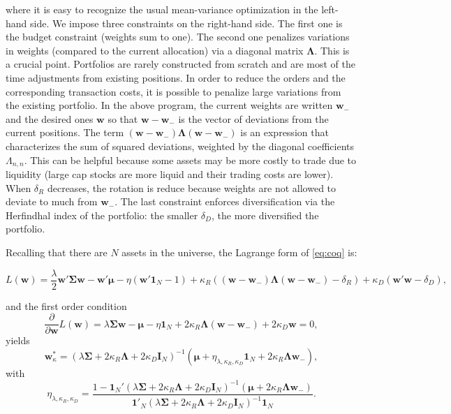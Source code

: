 \documentclass[]{krantz}
\theoremstyle{definition}
\theoremstyle{definition}
\theoremstyle{definition}
\theoremstyle{remark}
\begin{document}
where it is easy to recognize the usual mean-variance optimization in
the left-hand side. We impose three constraints on the right-hand side.
The first one is the budget constraint (weights sum to one). The second
one penalizes variations in weights (compared to the current allocation)
via a diagonal matrix \(\boldsymbol{\Lambda}\). This is a crucial point.
Portfolios are rarely constructed from scratch and are most of the time
adjustments from existing positions. In order to reduce the orders and
the corresponding transaction costs, it is possible to penalize large
variations from the existing portfolio. In the above program, the
current weights are written \(\textbf{w}_-\) and the desired ones
\(\textbf{w}\) so that \(\textbf{w}-\textbf{w}_-\) is the vector of
deviations from the current positions. The term
\((\textbf{w}-\textbf{w}_-)\boldsymbol{\Lambda}(\textbf{w}-\textbf{w}_-)\)
is an expression that characterizes the sum of squared deviations,
weighted by the diagonal coefficients \(\Lambda_{n,n}\). This can be
helpful because some assets may be more costly to trade due to liquidity
(large cap stocks are more liquid and their trading costs are lower).
When \(\delta_R\) decreases, the rotation is reduce because weights are
not allowed to deviate to much from \(\textbf{w}_-\). The last
constraint enforces diversification via the Herfindhal index of the
portfolio: the smaller \(\delta_D\), the more diversified the portfolio.

Recalling that there are \(N\) assets in the universe, the Lagrange form
of \eqref{eq:coq} is:

\begin{equation}
\label{eq:lagrangew}
L(\textbf{w})= \frac{\lambda}{2} \textbf{w}'\boldsymbol{\Sigma}\textbf{w}-\textbf{w}'\boldsymbol{\mu}-\eta (\textbf{w}'\textbf{1}_N-1)+\kappa_R ( (\textbf{w}-\textbf{w}_-)\boldsymbol{\Lambda}(\textbf{w}-\textbf{w}_-) - \delta_R)+\kappa_D(\textbf{w}'\textbf{w}-\delta_D),
\end{equation}

and the first order condition
\[\frac{\partial}{\partial \textbf{w}}L(\textbf{w})= \lambda \boldsymbol{\Sigma}\textbf{w}-\boldsymbol{\mu}-\eta\textbf{1}_N+2\kappa_R \boldsymbol{\Lambda}(\textbf{w}-\textbf{w}_-)+2\kappa_D\textbf{w}=0,\]
yields \begin{equation}
\label{eq:coqw}
\textbf{w}^*_\kappa=  (\lambda \boldsymbol{\Sigma}+2\kappa_R \boldsymbol{\Lambda} +2\kappa_D\textbf{I}_N)^{-1} \left(\boldsymbol{\mu} + \eta_{\lambda,\kappa_R,\kappa_D} \textbf{1}_N+2\kappa_R \boldsymbol{\Lambda}\textbf{w}_-\right),
\end{equation} with
\[\eta_{\lambda,\kappa_R,\kappa_D}=\frac{1- \textbf{1}_N'(\lambda\boldsymbol{\Sigma}+2\kappa_R \boldsymbol{\Lambda}+2\kappa_D\textbf{I}_N)^{-1}(\boldsymbol{\mu}+2\kappa_R\boldsymbol{\Lambda}\textbf{w}_-)}{\textbf{1}'_N(\lambda \boldsymbol{\Sigma}+2\kappa_R \boldsymbol{\Lambda}+2\kappa_D\textbf{I}_N)^{-1}\textbf{1}_N}.\]
\end{document}
